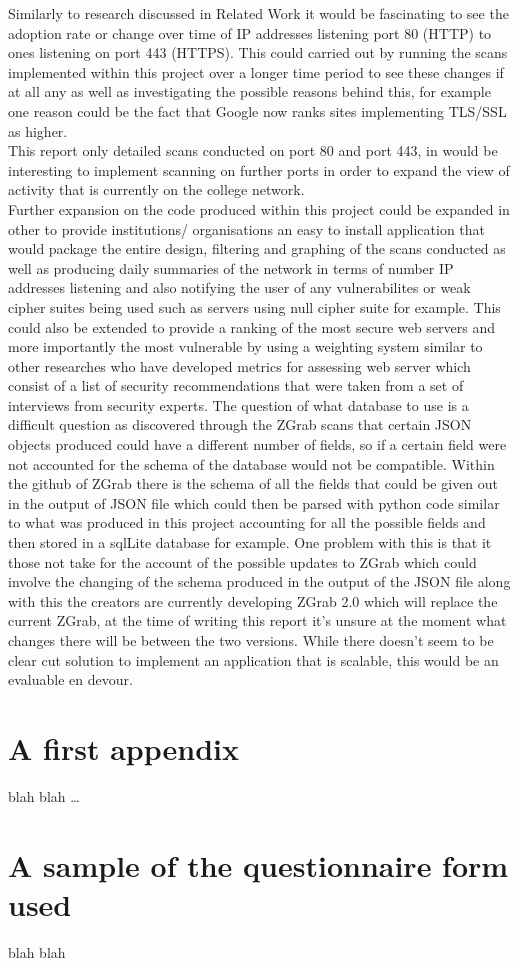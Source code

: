 \documentclass[a4wide,leqno,12pt]{report}
\begin{document}
Similarly to research discussed in Related Work \cite{durumeric2013zmap} \cite{durumeric2013analysis} it would be fascinating to see the adoption rate or change over time of IP addresses listening port 80 (HTTP) to ones listening on port 443 (HTTPS). This could carried out by running the scans implemented within this project over a longer time period to see these changes if at all any as well as investigating the possible reasons behind this, for example one reason could be the fact that Google now ranks sites implementing TLS/SSL as higher.\\


This report only detailed scans conducted on port 80 and port 443, in would be interesting to implement scanning on further ports in order to expand the view of activity that is currently on the college network.\\

Further expansion on the code produced within this project could be expanded in other to provide institutions/ organisations an easy to install application that would package the entire design, filtering and graphing of the scans conducted as well as producing daily summaries of the network in terms of number IP addresses listening and also notifying the user of any vulnerabilites or weak cipher suites being used such as servers using null cipher suite for example. This could also be extended to provide a ranking of the most secure web servers and more importantly the most vulnerable by using a weighting system similar to other researches \cite{mendes2008assessing} who have developed metrics for assessing web server which consist of a list of security recommendations that were taken from a set of interviews from security experts. The question of what database to use is a difficult question as discovered through the ZGrab scans that certain JSON objects produced could have a different number of fields, so if a certain field were not accounted for the schema of the database would not be compatible. Within the github of ZGrab \cite{zgrabGithub} there is the schema of all the fields that could be given out in the output of JSON file which could then be parsed with python code similar to what was produced in this project accounting for all the possible fields and then stored in a sqlLite database for example. One problem with this is that it those not take for the account of the possible updates to ZGrab which could involve the changing of the schema produced in the output of the JSON file along with this the creators are currently developing ZGrab 2.0 \cite{zgrab2Github} which will replace the current ZGrab, at the time of writing this report it's unsure at the moment what changes there will be between the two versions. While there doesn't seem to be clear cut solution to implement an application that is scalable, this would be an evaluable en devour.






\appendix
\chapter{A first appendix}

blah blah \ldots


\chapter{A sample of the questionnaire form used}

blah blah
\end{document}
